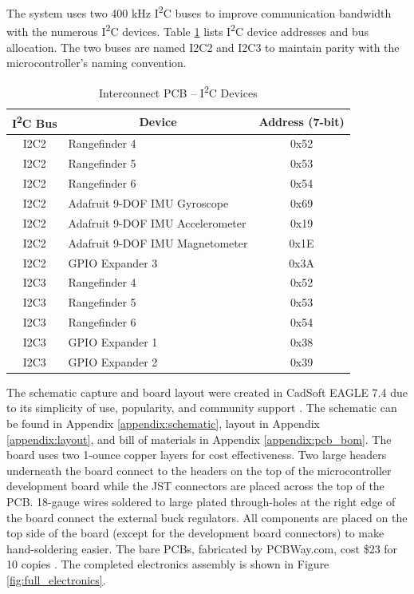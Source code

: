 The system uses two 400 kHz I\textsuperscript{2}C buses to improve communication bandwidth with the numerous I\textsuperscript{2}C devices. Table \ref{tab:i2c_table} lists I\textsuperscript{2}C device addresses and bus allocation. The two buses are named I2C2 and I2C3 to maintain parity with the microcontroller's naming convention.
\begin{table}[h]
	\centering	\caption{Interconnect PCB -- I\textsuperscript{2}C Devices}  \label{tab:i2c_table}
	\begin{tabular}{clc}
		\toprule 
		\multicolumn{1}{c}{I\textsuperscript{2}C Bus} & \multicolumn{1}{c}{Device} & Address (7-bit) \\ 
		\midrule 
		I2C2 & Rangefinder 4 & 0x52 \\  
		I2C2 & Rangefinder 5 & 0x53 \\  
		I2C2 & Rangefinder 6 & 0x54 \\  
		I2C2 & Adafruit 9-DOF IMU Gyroscope & 0x69 \\ 
		I2C2 & Adafruit 9-DOF IMU Accelerometer & 0x19\\ 		
		I2C2 & Adafruit 9-DOF IMU Magnetometer & 0x1E \\ 		
		I2C2 & GPIO Expander 3 & 0x3A \\ 				
		\hline
		I2C3 & Rangefinder 4 & 0x52 \\  
		I2C3 & Rangefinder 5 & 0x53 \\  
		I2C3 & Rangefinder 6 & 0x54 \\  
		I2C3 & GPIO Expander 1 & 0x38 \\ 				
		I2C3 & GPIO Expander 2 & 0x39 \\ 
		\bottomrule				
	\end{tabular} 
\end{table}
The schematic capture and board layout were created in CadSoft EAGLE 7.4 due to its simplicity of use, popularity, and community support \cite{eagle}. The schematic can be found in Appendix \ref{appendix:schematic}, layout in Appendix \ref{appendix:layout}, and bill of materials in Appendix  \ref{appendix:pcb_bom}. The board uses two 1-ounce copper layers for cost effectiveness. Two large headers underneath the board connect to the headers on the top of the microcontroller development board while the JST connectors are placed across the top of the PCB. 18-gauge wires soldered to large plated through-holes at the right edge of the board connect the external buck regulators. All components are placed on the top side of the board (except for the development board connectors) to make hand-soldering easier. The bare PCBs, fabricated by PCBWay.com, cost \$23 for 10 copies \cite{pcbway}. The completed electronics assembly is shown in Figure \ref{fig:full_electronics}.
